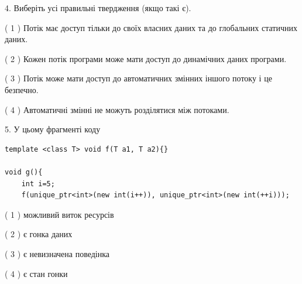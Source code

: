 \documentclass[12pt, ukrainian]{article}
\begin{document}
\begin {large}
{%
4. Виберіть усі правильні твердження (якщо такі є).\par
\vspace{2mm}

( 1 ) Потік має доступ тільки до своїх власних даних та до глобальних статичних даних.%

( 2 ) Кожен потік програми може мати доступ до динамічних даних програми.%

( 3 ) Потік може мати доступ до автоматичних змінних іншого потоку і це безпечно.%

( 4 ) Автоматичні змінні не можуть розділятися між потоками.%


5. У цьому фрагменті коду
\begin{verbatim}
template <class T> void f(T a1, T a2){}

void g(){
    int i=5;
    f(unique_ptr<int>(new int(i++)), unique_ptr<int>(new int(++i)));
\end{verbatim}

( 1 ) можливий виток ресурсів%

( 2 ) є гонка даних%

( 3 ) є невизначена поведінка%

( 4 ) є стан гонки%
}
\end {large}
\end{document}
